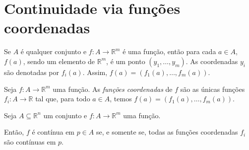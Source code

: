 \section{Continuidade via funções coordenadas}
Se $A$ é qualquer conjunto e $f: A \to \mathbb R^m$ é uma função, então para cada $a \in A$, $f(a)$, sendo um elemento de $\mathbb R^m$, é um ponto $(y_1, \dots, y_m)$.
As coordenadas $y_i$ são denotadas por $f_i(a)$.
Assim, $f(a) = (f_1(a), \dots, f_m(a))$.

\begin{definition}
    Seja $f: A \to \mathbb R^m$ uma função.
    As \emph{funções coordenadas} de $f$ são as únicas funções $f_i: A \to \mathbb R$ tal que, para todo $a \in A$, temos $f(a) = (f_1(a), \dots, f_m(a))$.
\end{definition}

\begin{proposition}
    Seja $A\subseteq \mathbb R^n$ um conjunto e $f: A \to \mathbb R^m$ uma função.

    Então, $f$ é contínua em $p \in A$ se, e somente se, todas as funções coordenadas $f_i$ são contínuas em $p$.
\end{proposition}

